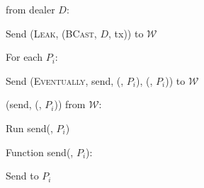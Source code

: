 \begin{bbox}[title={$\mathcal{F}_\mathsf{RBC}$}]

\OnInput {} from dealer $D$:

	\quad Send (\textsc{Leak}, (\textsc{BCast}, $D$, \textsf{tx})) to $\mathcal{W}$

	\quad For each $P_i$:
	
		\qquad Send (\textsc{Eventually}, \textsf{send}, (, $P_i$), (, $P_i$)) to $\mathcal{W}$
	
\OnInput (\textsf{send}, (, $P_i$)) from $\mathcal{W}$:

	\quad Run \textsf{send}(, $P_i$)
	
Function \textsf{send}(, $P_i$):

	\quad Send  to $P_i$
\end{bbox}